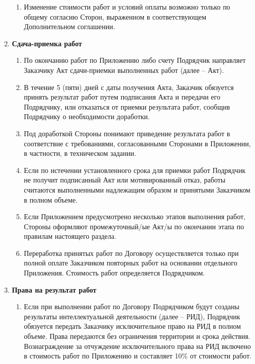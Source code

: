 \documentclass[14pt,a4paper]{article}
\begin{document}
\begin{enumerate}
\begin{enumerate}
		\item Изменение стоимости работ и условий оплаты возможно только по общему согласию Сторон, выраженном в соответствующем Дополнительном соглашении.
	\end{enumerate}

	\item
	\begin{center}
	\textbf{Сдача-приемка работ}
	\end{center}
	\begin{enumerate}
		\item По окончанию работ по Приложению либо счету Подрядчик направляет Заказчику Акт сдачи-приемки выполненных работ (далее – Акт).

		\item В течение 5 (пяти) дней с даты получения Акта, Заказчик обязуется принять результат работ путем подписания Акта и передачи его Подрядчику, или отказаться от приемки результата работ, сообщив Подрядчику о необходимости доработки.

		\item Под доработкой Стороны понимают приведение результата работ в соответствие с требованиями, согласованными Сторонами в Приложении, в частности, в техническом задании.

		\item Если по истечении установленного срока для приемки работ Подрядчик не получит подписанный Акт или мотивированный отказ, работы считаются выполненными надлежащим образом и принятыми Заказчиком в полном объеме.

		\item Если Приложением предусмотрено несколько этапов выполнения работ,
		Стороны оформляют промежуточный/ые Акт/ы по окончании этапа по правилам настоящего раздела.

		\item Переработка принятых работ по Договору осуществляется только при полной оплате Заказчиком повторных работ на основании отдельного Приложения. Стоимость работ определяется Подрядчиком.
	\end{enumerate}

	\item
	\begin{center}
	\textbf{Права на результат работ}
	\end{center}
	\begin{enumerate}
		\item Если при выполнении работ по Договору Подрядчиком будут созданы результаты интеллектуальной деятельности (далее – РИД), Подрядчик обязуется передать Заказчику исключительное право на РИД в полном объеме. Права передаются без ограничения территории и срока действия. Вознаграждение за отчуждение исключительного права на РИД включено в стоимость работ по Приложению и составляет 10\% от стоимости работ.


\end{enumerate}
\end{enumerate}
\end{document}

